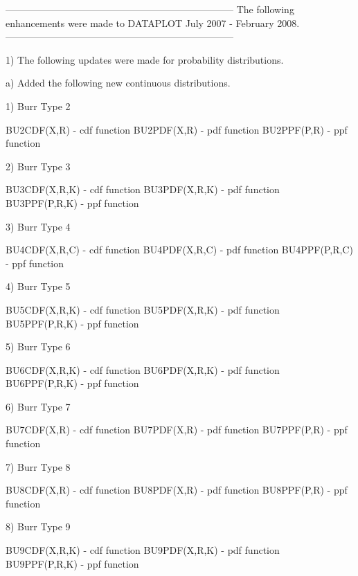 {-----------------------------------------------------------------------
The following enhancements were made to DATAPLOT
July 2007 - February  2008.
-----------------------------------------------------------------------

 1) The following updates were made for probability
    distributions.

    a) Added the following new continuous distributions.

        1) Burr Type 2
 
           BU2CDF(X,R)                   - cdf function
           BU2PDF(X,R)                   - pdf function
           BU2PPF(P,R)                   - ppf function
 
        2) Burr Type 3
 
           BU3CDF(X,R,K)                 - cdf function
           BU3PDF(X,R,K)                 - pdf function
           BU3PPF(P,R,K)                 - ppf function
 
        3) Burr Type 4
 
           BU4CDF(X,R,C)                 - cdf function
           BU4PDF(X,R,C)                 - pdf function
           BU4PPF(P,R,C)                 - ppf function
 
        4) Burr Type 5
 
           BU5CDF(X,R,K)                 - cdf function
           BU5PDF(X,R,K)                 - pdf function
           BU5PPF(P,R,K)                 - ppf function
 
        5) Burr Type 6
 
           BU6CDF(X,R,K)                 - cdf function
           BU6PDF(X,R,K)                 - pdf function
           BU6PPF(P,R,K)                 - ppf function
 
        6) Burr Type 7
 
           BU7CDF(X,R)                   - cdf function
           BU7PDF(X,R)                   - pdf function
           BU7PPF(P,R)                   - ppf function
 
        7) Burr Type 8
 
           BU8CDF(X,R)                   - cdf function
           BU8PDF(X,R)                   - pdf function
           BU8PPF(P,R)                   - ppf function
 
        8) Burr Type 9
 
           BU9CDF(X,R,K)                 - cdf function
           BU9PDF(X,R,K)                 - pdf function
           BU9PPF(P,R,K)                 - ppf function
 
}
